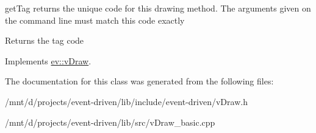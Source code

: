 get\+Tag returns the unique code for this drawing method. The arguments given on the command line must match this code exactly 

\begin{DoxyReturn}{Returns}
the tag code 
\end{DoxyReturn}


Implements \hyperlink{classev_1_1vDraw_ac01381befeffef2b930cbceb28b18a28}{ev\+::v\+Draw}.



The documentation for this class was generated from the following files\+:\begin{DoxyCompactItemize}
\item 
/mnt/d/projects/event-\/driven/lib/include/event-\/driven/v\+Draw.\+h\item 
/mnt/d/projects/event-\/driven/lib/src/v\+Draw\+\_\+basic.\+cpp\end{DoxyCompactItemize}
